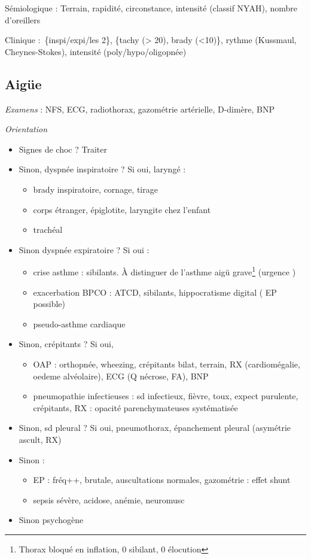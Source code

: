 Sémiologique : Terrain, rapidité, circonstance, intensité (classif NYAH), nombre d'oreillers

Clinique : \{inspi/expi/les 2\}, \{tachy (> 20), brady (<10)\}, rythme
(Kussmaul, Cheynes-Stokes), intensité (poly/hypo/oligopnée)

\subsection{Aigüe}
\textit{Examens}  : NFS, ECG, radiothorax, gazométrie artérielle, D-dimère, BNP

\textit{Orientation} 
\begin{itemize}
  \item Signes de choc ? Traiter
  \item Sinon, dyspnée inspiratoire ? Si oui, laryngé : 
    \begin{itemize}
      \item brady inspiratoire, cornage, tirage
      \item {corps étranger, épiglotite, laryngite} chez l'enfant
      \item trachéal
    \end{itemize}
  \item Sinon  dyspnée expiratoire ? Si oui : 
    \begin{itemize}
      \item crise asthme : sibilants. À distinguer de l'asthme aigü
        grave\footnote{Thorax bloqué en inflation, 0 sibilant, 0 élocution}
        (urgence \danger)
      \item exacerbation BPCO : ATCD, sibilants, hippocratisme digital (\danger
        EP possible)
      \item pseudo-asthme cardiaque
    \end{itemize}
  \item Sinon, crépitants ? Si oui, 
    \begin{itemize}
      \item OAP : orthopnée, wheezing, crépitants bilat, terrain, RX
        (cardiomégalie, oedeme alvéolaire), ECG (Q nécrose, FA), BNP \inc
      \item pneumopathie infectieuses : sd infectieux, fièvre, toux, expect
        purulente, crépitants, RX : opacité parenchymateuses systématisée
    \end{itemize}
  \item Sinon, sd pleural ? Si oui, pneumothorax, épanchement pleural (asymétrie
    ascult, RX)
  \item Sinon : 
    \begin{itemize}
      \item EP : fréq++, brutale, auscultations normales, gazométrie : effet
        shunt
      \item sepsis sévère, acidose, anémie, neuromusc
    \end{itemize}
  \item Sinon psychogène
\end{itemize}

